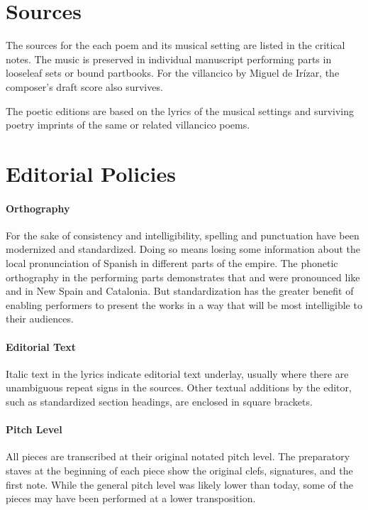 \section{Sources}

The sources for the each poem and its musical setting are listed in the critical notes.
The music is preserved in individual manuscript performing parts in looseleaf sets or bound partbooks.
For the villancico by Miguel de Irízar, the composer's draft score also survives.

The poetic editions are based on the lyrics of the musical settings and surviving poetry imprints of the same or related villancico poems.

\section{Editorial Policies}

\paragraph{Orthography}
For the sake of consistency and intelligibility, spelling and punctuation have been modernized and standardized.
Doing so means losing some information about the local pronunciation of Spanish in different parts of the empire.
The phonetic orthography in the performing parts demonstrates that  and  were pronounced like  and  in New Spain and Catalonia.
But standardization has the greater benefit of enabling performers to present the works in a way that will be most intelligible to their audiences.

\paragraph{Editorial Text}
Italic text in the lyrics indicate editorial text underlay, usually where there are unambiguous repeat signs in the sources.
Other textual additions by the editor, such as standardized section headings, are enclosed in square brackets.

\paragraph{Pitch Level}
All pieces are transcribed at their original notated pitch level.
The preparatory staves at the beginning of each piece show the original clefs, signatures, and the first note.
While the  general pitch level was likely lower than today, some of the pieces may have been performed at a lower transposition.


